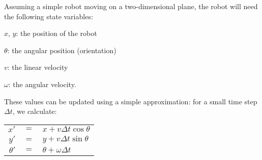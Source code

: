 \documentclass[10pt,a4paper]{article}
\newenvironment{itemize_packed}{
\begin{itemize}
\setlength{\itemsep}{0pt}
\setlength{\parskip}{0pt}
}{\end{itemize}}
\begin{document}
Assuming a simple robot moving on a two-dimensional plane, the robot will need the following state variables:
\begin{itemize_packed}
\item $x$, $y$: the position of the robot
\item $\theta$: the angular position (orientation)
\item $v$: the linear velocity
\item $\omega$: the angular velocity.
\end{itemize_packed}
These values can be updated using a simple approximation: for a small time step $\Delta t$, we calculate:
\begin{center}
\begin{tabular}{r@{} @{ }c@{ } @{}l}
$x'$ & $=$ & $x + v\Delta t \cos \theta$ \\
$y'$ & $=$ & $y + v\Delta t \sin \theta$ \\
$\theta'$ & $=$ & $\theta + \omega \Delta t$
\end{tabular}
\end{center}
\end{document}

